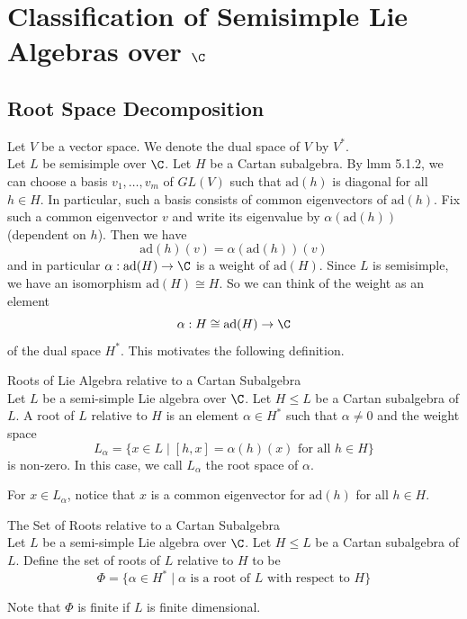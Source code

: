 \documentclass[a4paper]{article}
\begin{document}
\pagebreak
\section{Classification of Semisimple Lie Algebras over $\C$}
\subsection{Root Space Decomposition}
Let $V$ be a vector space. We denote the dual space of $V$ by $V^\ast$. \\

Let $L$ be semisimple over $\C$. Let $H$ be a Cartan subalgebra. By lmm 5.1.2, we can choose a basis $v_1,\dots,v_m$ of $GL(V)$ such that $\text{ad}(h)$ is diagonal for all $h\in H$. In particular, such a basis consists of common eigenvectors of $\text{ad}(h)$. Fix such a common eigenvector $v$ and write its eigenvalue by $\alpha(\text{ad}(h))$ (dependent on $h$). Then we have $$\text{ad}(h)(v)=\alpha(\text{ad}(h))(v)$$ and in particular $\alpha:\text{ad}(H)\to\C$ is a weight of $\text{ad}(H)$. Since $L$ is semisimple, we have an isomorphism $\text{ad}(H)\cong H$. So we can think of the weight as an element $$\alpha:H\cong\text{ad}(H)\to\C$$ of the dual space $H^\ast$. This motivates the following definition. 

\begin{defn}{Roots of Lie Algebra relative to a Cartan Subalgebra}{} \\Let $L$ be a semi-simple Lie algebra over $\C$. Let $H\leq L$ be a Cartan subalgebra of $L$. A root of $L$ relative to $H$ is an element $\alpha\in H^\ast$ such that $\alpha\neq 0$ and the weight space $$L_\alpha=\{x\in L\;|\;[h,x]=\alpha(h)(x)\text{ for all }h\in H\}$$ is non-zero. In this case, we call $L_\alpha$ the root space of $\alpha$. 
\end{defn}

For $x\in L_\alpha$, notice that $x$ is a common eigenvector for $\text{ad}(h)$ for all $h\in H$. 

\begin{defn}{The Set of Roots relative to a Cartan Subalgebra}{} \\Let $L$ be a semi-simple Lie algebra over $\C$. Let $H\leq L$ be a Cartan subalgebra of $L$. Define the set of roots of $L$ relative to $H$ to be $$\Phi=\{\alpha\in H^\ast\;|\;\alpha\text{ is a root of }L\text{ with respect to }H\}$$
\end{defn}

Note that $\Phi$ is finite if $L$ is finite dimensional. 
\end{document}
